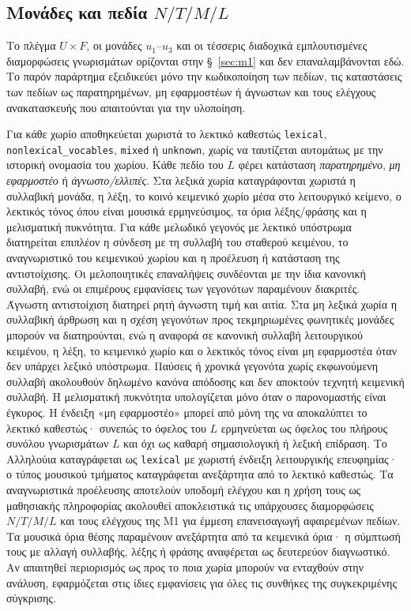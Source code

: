 \documentclass[11pt,a4paper]{article}
\begin{document}
\subsection{\texorpdfstring{Μονάδες και πεδία \(N/T/M/L\)}{Μονάδες και πεδία N/T/M/L}}\label{app:repr-fields}

Το πλέγμα $U\times F$, οι μονάδες $u_1$--$u_3$ και οι τέσσερις διαδοχικά εμπλουτισμένες διαμορφώσεις γνωρισμάτων ορίζονται στην §~\ref{sec:m1} και δεν επαναλαμβάνονται εδώ. Το παρόν παράρτημα εξειδικεύει μόνο την κωδικοποίηση των πεδίων, τις καταστάσεις των πεδίων ως παρατηρημένων, μη εφαρμοστέων ή άγνωστων και τους ελέγχους ανακατασκευής που απαιτούνται για την υλοποίηση.

Για κάθε χωρίο αποθηκεύεται χωριστά το λεκτικό καθεστώς \texttt{lexical}, \texttt{nonlexical\_vocables}, \texttt{mixed} ή \texttt{unknown}, χωρίς να ταυτίζεται αυτομάτως με την ιστορική ονομασία του χωρίου. Κάθε πεδίο του $L$ φέρει κατάσταση \emph{παρατηρημένο}, \emph{μη εφαρμοστέο} ή \emph{άγνωστο/ελλιπές}. Στα λεξικά χωρία καταγράφονται χωριστά η συλλαβική μονάδα, η λέξη, το κοινό κειμενικό χωρίο μέσα στο λειτουργικό κείμενο, ο λεκτικός τόνος όπου είναι μουσικά ερμηνεύσιμος, τα όρια λέξης/φράσης και η μελισματική πυκνότητα. Για κάθε μελωδικό γεγονός με λεκτικό υπόστρωμα διατηρείται επιπλέον η σύνδεση με τη συλλαβή του σταθερού κειμένου, το αναγνωριστικό του κειμενικού χωρίου και η προέλευση ή κατάσταση της αντιστοίχισης. Οι μελοποιητικές επαναλήψεις συνδέονται με την ίδια κανονική συλλαβή, ενώ οι επιμέρους εμφανίσεις των γεγονότων παραμένουν διακριτές. Άγνωστη αντιστοίχιση διατηρεί ρητή άγνωστη τιμή και αιτία. Στα μη λεξικά χωρία η συλλαβική άρθρωση και η σχέση γεγονότων προς τεκμηριωμένες φωνητικές μονάδες μπορούν να διατηρούνται, ενώ η αναφορά σε κανονική συλλαβή λειτουργικού κειμένου, η λέξη, το κειμενικό χωρίο και ο λεκτικός τόνος είναι μη εφαρμοστέα όταν δεν υπάρχει λεξικό υπόστρωμα. Παύσεις ή χρονικά γεγονότα χωρίς εκφωνούμενη συλλαβή ακολουθούν δηλωμένο κανόνα απόδοσης και δεν αποκτούν τεχνητή κειμενική συλλαβή. Η μελισματική πυκνότητα υπολογίζεται μόνο όταν ο παρονομαστής είναι έγκυρος. Η ένδειξη «μη εφαρμοστέο» μπορεί από μόνη της να αποκαλύπτει το λεκτικό καθεστώς· συνεπώς το όφελος του $L$ ερμηνεύεται ως όφελος του πλήρους συνόλου γνωρισμάτων $L$ και όχι ως καθαρή σημασιολογική ή λεξική επίδραση. Το Αλληλούια καταγράφεται ως \texttt{lexical} με χωριστή ένδειξη λειτουργικής επευφημίας· ο τύπος μουσικού τμήματος καταγράφεται ανεξάρτητα από το λεκτικό καθεστώς. Τα αναγνωριστικά προέλευσης αποτελούν υποδομή ελέγχου και η χρήση τους ως μαθησιακής πληροφορίας ακολουθεί αποκλειστικά τις υπάρχουσες διαμορφώσεις $N/T/M/L$ και τους ελέγχους της M1 για έμμεση επανεισαγωγή αφαιρεμένων πεδίων. Τα μουσικά όρια θέσης παραμένουν ανεξάρτητα από τα κειμενικά όρια· η σύμπτωσή τους με αλλαγή συλλαβής, λέξης ή φράσης αναφέρεται ως δευτερεύον διαγνωστικό. Αν απαιτηθεί περιορισμός ως προς το ποια χωρία μπορούν να ενταχθούν στην ανάλυση, εφαρμόζεται στις ίδιες εμφανίσεις για όλες τις συνθήκες της συγκεκριμένης σύγκρισης.
\end{document}
